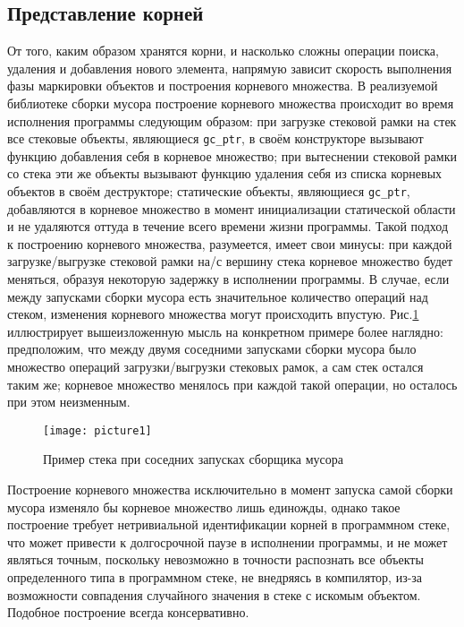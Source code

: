 \subsection{Представление корней}
От того, каким образом хранятся корни, и насколько сложны операции поиска, удаления и добавления нового элемента,
напрямую зависит скорость выполнения фазы маркировки объектов и построения корневого множества.
В реализуемой библиотеке сборки мусора построение корневого множества происходит во время исполнения программы
следующим образом: при загрузке стековой рамки на стек все стековые объекты,
являющиеся \lstinline[language= cpp]{gc_ptr}, в своём конструкторе вызывают функцию добавления себя в корневое множество;
при вытеснении стековой рамки со стека эти же объекты вызывают функцию удаления себя из списка корневых объектов
в своём деструкторе; статические объекты, являющиеся \lstinline[language= cpp]{gc_ptr}, добавляются в корневое множество
в момент инициализации статической области и не удаляются оттуда в течение всего времени жизни программы.
Такой подход к построению корневого множества, разумеется, имеет свои минусы: при каждой загрузке/выгрузке
стековой рамки на/с вершину стека корневое множество будет меняться, образуя некоторую
задержку в исполнении программы. В случае, если между запусками сборки мусора есть значительное количество операций
над стеком, изменения корневого множества могут происходить впустую. Рис.\ref{fig:stackLive} иллюстрирует вышеизложенную мысль
на конкретном примере более наглядно: предположим, что между двумя соседними запусками сборки мусора было множество
операций загрузки/выгрузки стековых рамок, а сам стек остался таким же; корневое множество менялось при каждой такой
операции, но осталось при этом неизменным.

\begin{figure}[h!]
	\centering
	\texttt{[image: picture1]}
	\caption{Пример стека при соседних запусках сборщика мусора}
	\label{fig:stackLive}
\end{figure}

Построение корневого множества исключительно в момент запуска самой сборки мусора
изменяло бы корневое множество лишь единожды, однако такое построение требует нетривиальной идентификации корней
в программном стеке, что может привести к долгосрочной паузе в исполнении программы, и не может являться
точным, поскольку невозможно в точности распознать все объекты определенного типа в программном стеке, не
внедряясь в компилятор, из-за возможности совпадения случайного значения в стеке с искомым объектом. Подобное
построение всегда консервативно.

